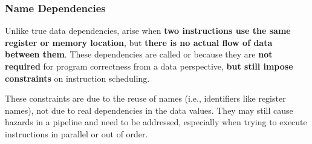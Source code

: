 \subsubsection{Name Dependencies}\label{subsubsection: Name Dependencies}

Unlike true data dependencies,  arise when \textbf{two instructions use the same register or memory location}, but \textbf{there is no actual flow of data between them}. These dependencies are called  or  because they are \textbf{not required} for program correctness from a data perspective, \textbf{but still impose constraints} on instruction scheduling.

\highspace
These constraints are due to the reuse of names (i.e., identifiers like register names), not due to real dependencies in the data values. They may still cause hazards in a pipeline and need to be addressed, especially when trying to execute instructions in parallel or out of order.

